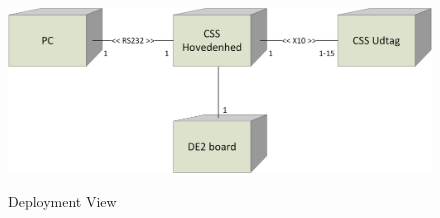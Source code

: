 
\begin{figure}[!htb]
     {\includegraphics[width=\textwidth]{billeder/uml/deployment_model}}
     \caption{Deployment View}
     \label{fig:Deployment model}
\end{figure}
